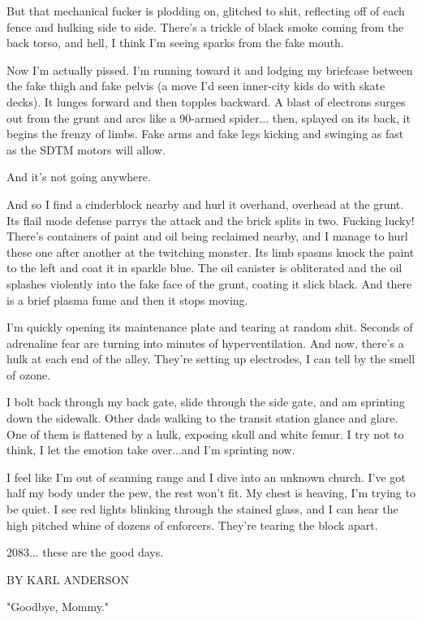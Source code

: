 \documentclass{amsbook}
\begin{document}
But that mechanical fucker is plodding on, glitched to shit, reflecting off of each fence and hulking side to side. There's a trickle of black smoke coming from the back torso, and hell, I think I'm seeing sparks from the fake mouth.

Now I'm actually pissed.  I'm running toward it and lodging my briefcase between the fake thigh and fake pelvis (a move I'd seen inner-city kids do with skate decks).  It lunges forward and then topples backward.  A blast of electrons surges out from the grunt and arcs like a 90-armed spider... then, splayed on its back, it begins the frenzy of limbs.  Fake arms and fake legs kicking and swinging as fast as the SDTM motors will allow.

And it's not going anywhere.

And so I find a cinderblock nearby and hurl it overhand, overhead at the grunt.  Its flail mode defense parrys the attack and the brick splits in two.  Fucking lucky!  There's containers of paint and oil being reclaimed nearby, and I manage to hurl these one after another at the twitching monster.  Its limb spasms knock the paint to the left and coat it in sparkle blue.  The oil canister is obliterated and the oil splashes violently into the fake face of the grunt, coating it slick black.  And there is a brief plasma fume and then it stops moving.  

I'm quickly opening its maintenance plate and tearing at random shit.  Seconds of adrenaline fear are turning into minutes of hyperventilation.  And now, there's a hulk at each end of the alley.  They're setting up electrodes, I can tell by the smell of ozone.

I bolt back through my back gate, slide through the side gate, and am sprinting down the sidewalk.  Other dads walking to the transit station glance and glare.  One of them is flattened by a hulk, exposing skull and white femur.  I try not to think, I let the emotion take over...and I'm sprinting now.

I feel like I'm out of scanning range and I dive into an unknown church.  I've got half my body under the pew, the rest won't fit.  My chest is heaving, I'm trying to be quiet.  I see red lights blinking through the stained glass, and I can hear the high pitched whine of dozens of enforcers.  They're tearing the block apart.

2083... these are the good days.
\clearpage

{\ROBOFONTx BY KARL ANDERSON}

"Goodbye, Mommy."
\end{document}
